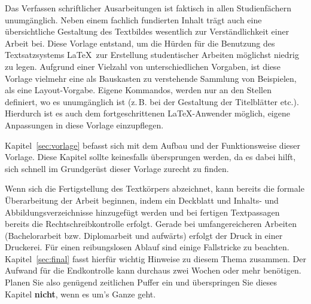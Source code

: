 Das Verfassen schriftlicher Ausarbeitungen ist faktisch in allen Studienfächern
unumgänglich. Neben einem fachlich fundierten Inhalt trägt auch eine
übersichtliche Gestaltung des Textbildes wesentlich zur Verständlichkeit einer
Arbeit bei. Diese Vorlage entstand, um die Hürden für die Benutzung des
Textsatzsystems \LaTeX\ zur Erstellung studentischer Arbeiten möglichst
niedrig zu legen. Aufgrund einer Vielzahl von unterschiedlichen Vorgaben, ist
diese Vorlage vielmehr eine als Bauskasten zu verstehende Sammlung von
Beispielen, als eine Layout-Vorgabe. Eigene Kommandos, werden nur an den
Stellen definiert, wo es unumgänglich ist (z.\,B. bei der Gestaltung der
Titelblätter etc.). Hierdurch ist es auch dem fortgeschrittenen
\LaTeX-Anwender möglich, eigene Anpassungen in diese Vorlage einzupflegen.

Kapitel~\ref{sec:vorlage} befasst sich mit dem Aufbau und der Funktionsweise
dieser Vorlage. Diese Kapitel sollte keinesfalls übersprungen werden, da es
dabei hilft, sich schnell im Grundgerüst dieser Vorlage zurecht zu finden.


Wenn sich die Fertigstellung des Textkörpers abzeichnet, kann bereits die
formale Überarbeitung der Arbeit beginnen, indem ein Deckblatt und Inhalts- und
Abbildungsverzeichnisse hinzugefügt werden und bei fertigen Textpassagen
bereits die Rechtschreibkontrolle erfolgt. Gerade bei umfangereicheren Arbeiten
(Bachelorarbeit bzw. Diplomarbeit und aufwärts) erfolgt der Druck in einer
Druckerei. Für einen reibungslosen Ablauf sind einige Fallstricke zu beachten.
Kapitel~\ref{sec:final} fasst hierfür wichtig Hinweise zu diesem Thema
zusammen. Der Aufwand für die Endkontrolle kann durchaus zwei Wochen oder mehr
benötigen. Planen Sie also genügend zeitlichen Puffer ein und überspringen Sie
dieses Kapitel \textbf{nicht}, wenn es um's Ganze geht.


